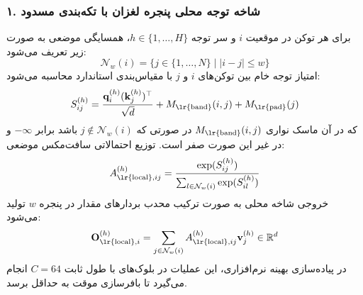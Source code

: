 \subsubsection*{۱. شاخه توجه محلی پنجره لغزان با تکه‌بندی مسدود}
برای هر توکن در موقعیت $i$ و سر توجه $h \in \{1, \dots, H\}$، همسایگی موضعی به صورت زیر تعریف می‌شود:
\begin{equation}
\mathcal{N}_w(i) = \{j \in \{1, \dots, N\} \mid |i - j| \le w\}
\end{equation}
امتیاز توجه خام بین توکن‌های $i$ و $j$ با مقیاس‌بندی استاندارد محاسبه می‌شود:
\begin{equation}
S_{ij}^{(h)} = \frac{\mathbf{q}_i^{(h)} (\mathbf{k}_j^{(h)})^\top}{\sqrt{d}} + M_{\text{\lr{band}}}(i, j) + M_{\text{\lr{pad}}}(j)
\end{equation}
که در آن ماسک نواری $M_{\text{\lr{band}}}(i, j)$ در صورتی که $j \notin \mathcal{N}_w(i)$ باشد برابر $-\infty$ و در غیر این صورت صفر است. توزیع احتمالاتی سافت‌مکس موضعی:
\begin{equation}
A_{\text{\lr{local}}, ij}^{(h)} = \frac{\exp(S_{ij}^{(h)})}{\sum_{l \in \mathcal{N}_w(i)} \exp(S_{il}^{(h)})}
\end{equation}
خروجی شاخه محلی به صورت ترکیب محدب بردارهای مقدار در پنجره $w$ تولید می‌شود:
\begin{equation}
\mathbf{O}_{\text{\lr{local}}, i}^{(h)} = \sum_{j \in \mathcal{N}_w(i)} A_{\text{\lr{local}}, ij}^{(h)} \mathbf{v}_j^{(h)} \in \mathbb{R}^d
\end{equation}
در پیاده‌سازی بهینه نرم‌افزاری، این عملیات در بلوک‌های با طول ثابت $C=64$ انجام می‌گیرد تا بافرسازی موقت به حداقل برسد.

